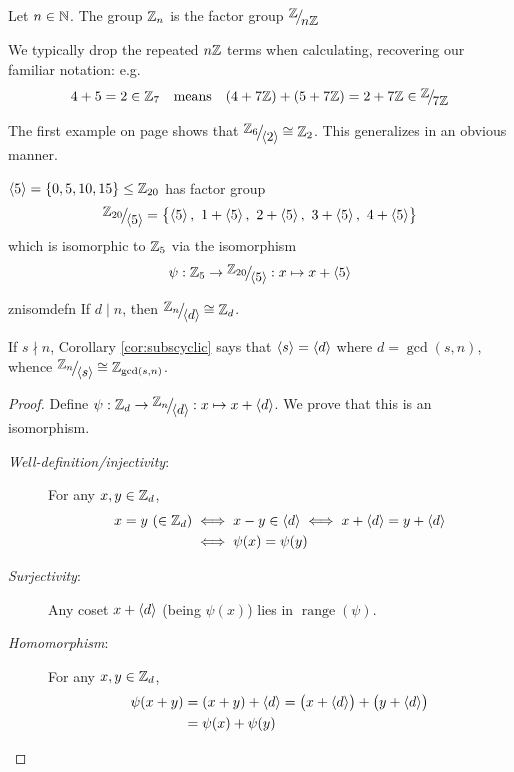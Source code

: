 \begin{defn}{}{}
	Let $n\in\mathbb{N}$. The group $\mathbb{Z}_n$ is the factor group $\quotient{\Z}{n\Z}$
\end{defn}

We typically drop the repeated $n\mathbb{Z}$ terms when calculating, recovering our familiar notation: e.g.
\[
	4+5=2\in\Z_7\quad\text{means}\quad (4+7\Z)+(5+7\Z)=2+7\Z \in\quotient{\Z}{7\Z}
\]



The first example on page \pageref{sec:factor} shows that $\quotient{\Z_6}{\ip 2} \cong\Z_2$. This generalizes in an obvious manner.

\begin{example}{}{}
	$\left\langle 5\right\rangle=\{0,5,10,15\}\le\mathbb{Z}_{20}$ has factor group
	\[
		\quotient{\Z_{20}}{\ip 5}=\bigl\{\ip 5,\ 1+\ip 5,\ 2+\ip 5,\ 3+\ip 5,\ 4+\ip 5\bigr\}
	\]
	which is isomorphic to $\mathbb{Z}_5$ via the isomorphism
	\[
		\psi:\Z_5\to\quotient{\Z_{20}}{\ip 5}:x\mapsto x+\ip 5
	\]
\end{example}


\begin{thm}{}{znisomdefn}
	If $d\mid n$, then $\quotient{\Z_n}{\ip d}\cong\Z_d$.
\end{thm}

If $s\nmid n$, Corollary \ref{cor:subscyclic} says that $\left\langle s\right\rangle=\left\langle d\right\rangle$ where $d=\gcd(s,n)$, whence $\quotient{\Z_n}{\ip s}\cong\Z_{\gcd(s,n)}$.

\begin{proof}
	Define $\psi:\Z_d\to\quotient{\Z_n}{\ip d}:x\mapsto x+\ip d$. We prove that this is an isomorphism.
	\begin{description}
		\item[\normalfont\emph{Well-definition/injectivity}:] For any $x,y\in\mathbb{Z}_d$,
		\begin{align*}
			x=y\ (\in\mathbb{Z}_d)&\iff x-y\in\left\langle d\right\rangle\iff x+\left\langle d\right\rangle=y+\left\langle d\right\rangle\\
			&\iff \psi(x)=\psi(y)
		\end{align*}
		\item[\normalfont\emph{Surjectivity}:] Any coset $x+\left\langle d\right\rangle$ (being $\psi(x)$) lies in $\operatorname{range}(\psi)$.	
		\item[\normalfont\emph{Homomorphism}:] For any $x,y\in\mathbb{Z}_d$,
		\begin{align*}
			\psi(x+y)&=(x+y)+\left\langle d\right\rangle =\bigl(x+\left\langle d\right\rangle\bigr)+\bigl(y+\left\langle d\right\rangle\bigr)\\
			&=\psi(x)+\psi(y) \tag*{\qedhere}		
		\end{align*}
	\end{description}
\end{proof}


